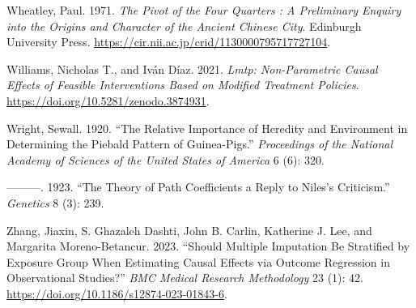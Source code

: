 \documentclass[
  singlecolumn]{report}
\newlength{\cslhangindent}
\newlength{\cslentryspacingunit} %
\newenvironment{CSLReferences}[2] %
 {%
  \setlength{\parindent}{0pt}
  \ifodd #1
  \let\oldpar\par
  \def\par{\hangindent=\cslhangindent\oldpar}
  \fi
  \setlength{\parskip}{#2\cslentryspacingunit}
 }%
 {}
\begin{document}
\begin{CSLReferences}{1}{0}
\leavevmode{}%
Wheatley, Paul. 1971. \emph{The Pivot of the Four Quarters : A
Preliminary Enquiry into the Origins and Character of the Ancient
Chinese City}. Edinburgh University Press.
\url{https://cir.nii.ac.jp/crid/1130000795717727104}.

\leavevmode{}%
Williams, Nicholas T., and Iván Díaz. 2021. \emph{Lmtp: Non-Parametric
Causal Effects of Feasible Interventions Based on Modified Treatment
Policies}. \url{https://doi.org/10.5281/zenodo.3874931}.

\leavevmode{}%
Wright, Sewall. 1920. {``The Relative Importance of Heredity and
Environment in Determining the Piebald Pattern of Guinea-Pigs.''}
\emph{Proceedings of the National Academy of Sciences of the United
States of America} 6 (6): 320.

\leavevmode{}%
---------. 1923. {``The Theory of Path Coefficients a Reply to Niles's
Criticism.''} \emph{Genetics} 8 (3): 239.

\leavevmode{}%
Zhang, Jiaxin, S. Ghazaleh Dashti, John B. Carlin, Katherine J. Lee, and
Margarita Moreno-Betancur. 2023. {``Should Multiple Imputation Be
Stratified by Exposure Group When Estimating Causal Effects via Outcome
Regression in Observational Studies?''} \emph{BMC Medical Research
Methodology} 23 (1): 42.
\url{https://doi.org/10.1186/s12874-023-01843-6}.

\end{CSLReferences}
\end{document}
